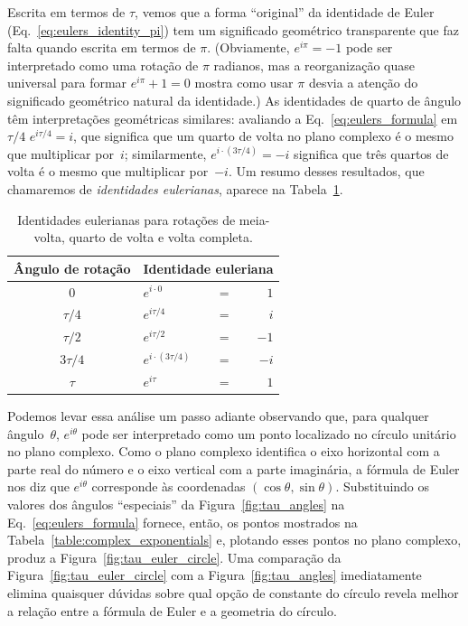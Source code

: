 {Escrita em termos de $\tau$, vemos que a forma ``original'' da identidade de Euler (Eq.~\eqref{eq:eulers_identity_pi}) tem um significado geométrico transparente que faz falta quando escrita em termos de $\pi$. (Obviamente, $e^{i\pi} = -1$ pode ser interpretado como uma rotação de $\pi$ radianos, mas a reorganização quase universal para formar $e^{i\pi} + 1 = 0$ mostra como usar $\pi$ desvia a atenção do significado geométrico natural da identidade.) As identidades de quarto de ângulo têm interpretações geométricas similares: avaliando a Eq.~\eqref{eq:eulers_formula} em $\tau/4$  $e^{i\tau/4} = i$, que significa que um quarto de volta no plano complexo é o mesmo que multiplicar por~$i$; similarmente, $e^{i\cdot(3\tau/4)} = -i$ significa que três quartos de volta é o mesmo que multiplicar por~$-i$. Um resumo desses resultados, que chamaremos de \emph{identidades eulerianas}, aparece na Tabela~\ref{table:eulerian_identities}.

\begin{table}
\begin{center}
\begin{tabular}{cllr}
Ângulo de rotação & \multicolumn{3}{c}{Identidade euleriana} \\ \hline
$0$ & $e^{i\cdot0}$ & $ = $ & $1$ \smallskip \\
$\tau/4$ & $e^{i\tau/4}$ & $ = $ & $i$ \smallskip \\
$\tau/2$ & $e^{i\tau/2}$ & $ = $ & $-1$ \smallskip \\
$3\tau/4$ & $e^{i\cdot(3\tau/4)}$ & $ = $ & $-i$ \smallskip \\
$\tau$ & $e^{i\tau}$ & $ = $ & $1$
\end{tabular}
\end{center}
\caption{Identidades eulerianas para rotações de meia-volta, quarto de volta e volta completa.\label{table:eulerian_identities}}
\end{table}

Podemos levar essa análise um passo adiante observando que, para qualquer ângulo~$\theta$, $e^{i\theta}$ pode ser interpretado como um ponto localizado no círculo unitário no plano complexo. Como o plano complexo identifica o eixo horizontal com a parte real do número e o eixo vertical com a parte imaginária, a fórmula de Euler nos diz que $e^{i\theta}$ corresponde às coordenadas $(\cos\theta, \sin\theta)$. Substituindo os valores dos ângulos ``especiais'' da Figura~\ref{fig:tau_angles} na Eq.~\eqref{eq:eulers_formula} fornece, então, os pontos mostrados na Tabela~\ref{table:complex_exponentials} e, plotando esses pontos no plano complexo, produz a Figura~\ref{fig:tau_euler_circle}. Uma comparação da Figura~\ref{fig:tau_euler_circle} com a Figura~\ref{fig:tau_angles} imediatamente elimina quaisquer dúvidas sobre qual opção de constante do círculo revela melhor a relação entre a fórmula de Euler e a geometria do círculo.

}
